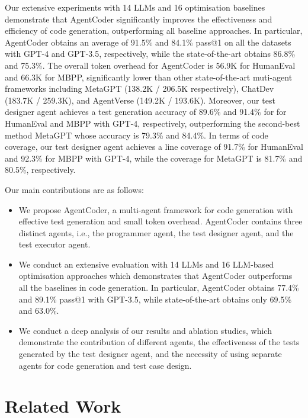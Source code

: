 \documentclass{article}
\newcommand{\xxx}{AgentCoder\xspace}
\begin{document}
Our extensive experiments with 14 LLMs and 16 optimisation baselines demonstrate that \xxx significantly improves the effectiveness and efficiency of code generation, outperforming all baseline approaches. 
In particular, \xxx obtains an average of 91.5\% and 84.1\% pass@1 on all the datasets with GPT-4 and GPT-3.5, respectively, while the state-of-the-art obtains 86.8\% and 75.3\%.
The overall token overhead for AgentCoder is 56.9K for HumanEval and 66.3K for MBPP, significantly lower than other state-of-the-art muti-agent frameworks including MetaGPT (138.2K / 206.5K respectively),
ChatDev (183.7K / 259.3K), and AgentVerse (149.2K / 193.6K). 
Moreover, our test designer agent achieves a test generation accuracy of 89.6\% and 91.4\% for for HumanEval and MBPP with GPT-4, respectively, outperforming the second-best method MetaGPT whose accuracy is 79.3\% and 84.4\%. In terms of code coverage, our test designer agent achieves a line coverage of 91.7\% for HumanEval and 92.3\% for MBPP with GPT-4, while the coverage for MetaGPT is 81.7\% and 80.5\%, respectively.  


Our main contributions are as follows:

\begin{itemize}
\item We propose \xxx, a multi-agent framework for code generation with effective test generation and small token overhead. \xxx contains three distinct agents, i.e., the programmer agent, the test designer agent, and the test executor agent.

\item We conduct an extensive evaluation with 14 LLMs and 16 LLM-based optimisation approaches which demonstrates that \xxx outperforms all the baselines in code generation. In particular, \xxx obtains 77.4\% and 89.1\% pass@1 with GPT-3.5, while state-of-the-art obtains only 69.5\% and 63.0\%. 

\item We conduct a deep analysis of our results and ablation studies, which demonstrate the contribution of different agents, the effectiveness of the tests generated by the test designer agent, and the necessity of using separate agents for code generation and test case design. 

\end{itemize}



\section{Related Work}
\end{document}
